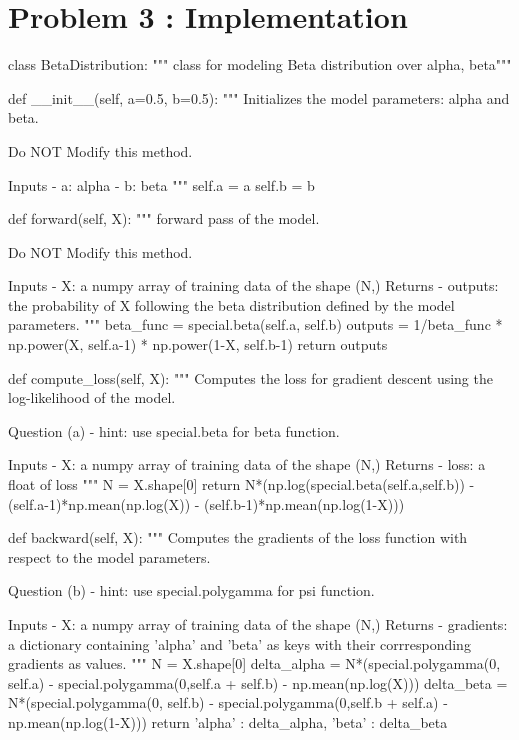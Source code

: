 \documentclass[10pt]{article}
\begin{document}
\appendix
\section{Problem 3 : Implementation}
\begin{python}
class BetaDistribution:
    """ class for modeling Beta distribution over alpha, beta"""

    def __init__(self, a=0.5, b=0.5):
        """
        Initializes the model parameters: alpha and beta.

        Do NOT Modify this method.

        Inputs
        - a: alpha
        - b: beta
        """
        self.a = a
        self.b = b

    def forward(self, X):
        """
        forward pass of the model.

        Do NOT Modify this method.

        Inputs
        - X: a numpy array of training data of the shape (N,)
        Returns
        - outputs: the probability of X following the beta distribution defined by the model parameters.
        """
        beta_func = special.beta(self.a, self.b)
        outputs = 1/beta_func * np.power(X, self.a-1) * np.power(1-X, self.b-1)
        return outputs

    def compute_loss(self, X):
        """
        Computes the loss for gradient descent using the log-likelihood of the model.

        Question (a)
        - hint: use special.beta for beta function.

        Inputs
        - X: a numpy array of training data of the shape (N,)
        Returns
        - loss: a float of loss
        """
        N = X.shape[0]
        return N*(np.log(special.beta(self.a,self.b)) - (self.a-1)*np.mean(np.log(X)) - (self.b-1)*np.mean(np.log(1-X)))

    def backward(self, X):
        """
        Computes the gradients of the loss function with respect to the model parameters.

        Question (b)
        - hint: use special.polygamma for psi function.

        Inputs
        - X: a numpy array of training data of the shape (N,)
        Returns
        - gradients: a dictionary containing 'alpha' and 'beta' as keys with their corrresponding gradients as values.
        """
        N = X.shape[0]
        delta_alpha =  N*(special.polygamma(0, self.a) - special.polygamma(0,self.a + self.b) - np.mean(np.log(X)))
        delta_beta = N*(special.polygamma(0, self.b) - special.polygamma(0,self.b + self.a) - np.mean(np.log(1-X)))
        return {'alpha' : delta_alpha, 'beta' : delta_beta}


\end{python}
\end{document}
